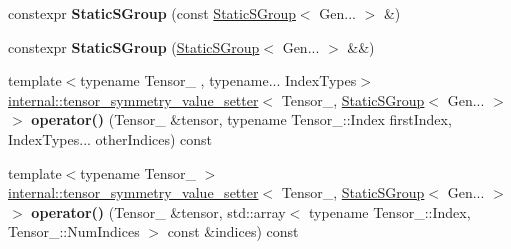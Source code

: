 \begin{DoxyCompactItemize}
\item 
\mbox{\label{class_eigen_1_1_static_s_group_a893bd13a44b92f748e19358821ab5b4d}} 
constexpr {\bfseries Static\+S\+Group} (const \hyperlink{class_eigen_1_1_static_s_group}{Static\+S\+Group}$<$ Gen... $>$ \&)
\item 
\mbox{\label{class_eigen_1_1_static_s_group_ac645a3ec3432d4d3305071f3c6be5366}} 
constexpr {\bfseries Static\+S\+Group} (\hyperlink{class_eigen_1_1_static_s_group}{Static\+S\+Group}$<$ Gen... $>$ \&\&)
\item 
\mbox{\label{class_eigen_1_1_static_s_group_a3fa803f2cf7032e27943f9cdb8d5c593}} 
{\footnotesize template$<$typename Tensor\+\_\+ , typename... Index\+Types$>$ }\\\hyperlink{class_eigen_1_1internal_1_1tensor__symmetry__value__setter}{internal\+::tensor\+\_\+symmetry\+\_\+value\+\_\+setter}$<$ Tensor\+\_\+, \hyperlink{class_eigen_1_1_static_s_group}{Static\+S\+Group}$<$ Gen... $>$ $>$ {\bfseries operator()} (Tensor\+\_\+ \&tensor, typename Tensor\+\_\+\+::\+Index first\+Index, Index\+Types... other\+Indices) const
\item 
\mbox{\label{class_eigen_1_1_static_s_group_a8b8eb04f4431719716cf2d75f546edc3}} 
{\footnotesize template$<$typename Tensor\+\_\+ $>$ }\\\hyperlink{class_eigen_1_1internal_1_1tensor__symmetry__value__setter}{internal\+::tensor\+\_\+symmetry\+\_\+value\+\_\+setter}$<$ Tensor\+\_\+, \hyperlink{class_eigen_1_1_static_s_group}{Static\+S\+Group}$<$ Gen... $>$ $>$ {\bfseries operator()} (Tensor\+\_\+ \&tensor, std\+::array$<$ typename Tensor\+\_\+\+::\+Index, Tensor\+\_\+\+::\+Num\+Indices $>$ const \&indices) const
\end{DoxyCompactItemize}
